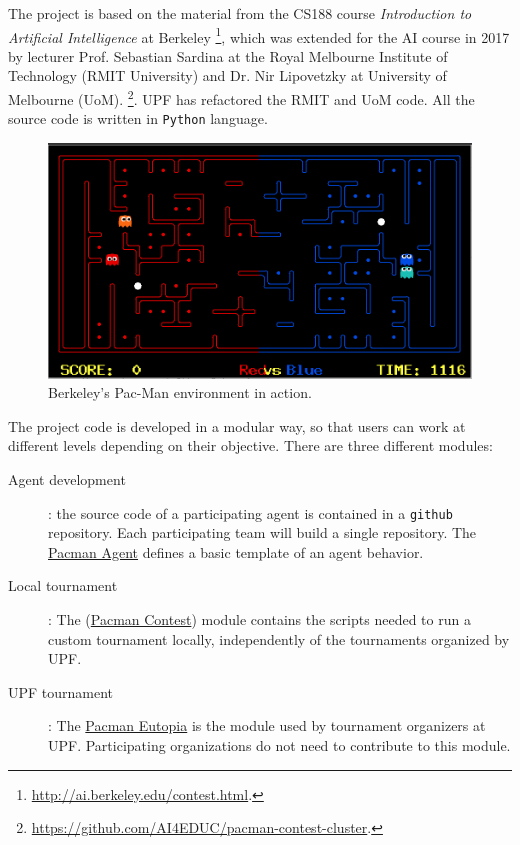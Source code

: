 \documentclass[11pt]{article}
\begin{document}
The project is based on the material from the CS188 course \emph{Introduction to Artificial Intelligence} at Berkeley \footnote{\url{http://ai.berkeley.edu/contest.html}.}, which was extended for the AI course in 2017 by lecturer Prof. Sebastian Sardina at the Royal Melbourne Institute of Technology (RMIT University) and Dr. Nir Lipovetzky at University of Melbourne (UoM). \footnote{\url{https://github.com/AI4EDUC/pacman-contest-cluster}.}.
UPF has refactored the RMIT and UoM code. All the source code is written in \texttt{Python} language.

\begin{figure}[h!]
    \center 
    \includegraphics[width =.8\textwidth]{pacman.png} 
    \caption{Berkeley's Pac-Man environment in action.}
\end{figure}



The project code is developed in a modular way, so that users can work at different levels depending on their objective. There are three different modules:

\begin{description}
    \item [Agent development]: the source code of a participating agent is contained in a \texttt{github} repository. Each participating team will build a single repository. The \href{https://github.com/aig-upf/pacman-agent}{Pacman Agent} defines a basic template of an agent behavior.

    \item [Local tournament]:
    The (\href{https://github.com/aig-upf/pacman-contest}{Pacman Contest}) module contains the scripts needed to run a custom tournament locally, independently of the tournaments organized by UPF.

    \item [UPF tournament]:
    The \href{https://github.com/aig-upf/pacman-eutopia}{Pacman Eutopia} is the module used by tournament organizers at UPF. Participating organizations do not need to contribute to this module.
\end{description}
\end{document}
